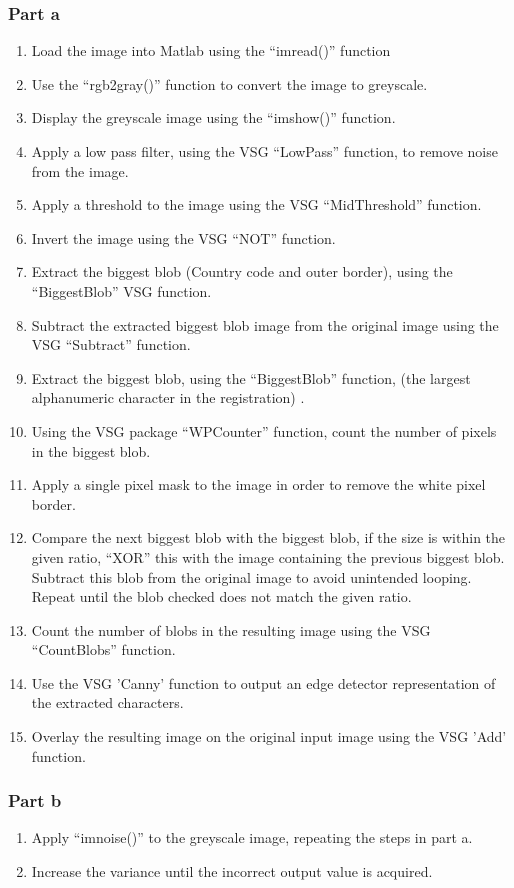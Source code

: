 \documentclass[a4paper]{article}
\begin{document}
	\subsubsection{Part a}
	\begin{enumerate}
		\item Load the image into Matlab using the ``imread()''
			function
		\item Use the ``rgb2gray()'' function to convert the image to
			greyscale.
		\item Display the greyscale image using the ``imshow()''
			function.
		\item Apply a low pass filter, using the VSG ``LowPass'' function,
			to remove noise from the image.
		\item Apply a threshold to the image using the VSG
			``MidThreshold'' function.
		\item Invert the image using the VSG ``NOT'' function.
		\item Extract the biggest blob (Country code and outer border),
			using the ``BiggestBlob'' VSG function.
		\item Subtract the extracted biggest blob image from the original
			image using the VSG ``Subtract'' function.
		\item Extract the biggest blob, using the ``BiggestBlob''
			function, (the largest alphanumeric character in the
			registration) .
		\item Using the VSG package ``WPCounter'' function, count the
			number of pixels in the biggest blob.
		\item Apply a single pixel mask to the image in order to remove
			the white pixel border.
		\item Compare the next biggest blob with the biggest blob, if
			the size is within the given ratio, ``XOR'' this with the
			image containing the previous biggest blob. Subtract
			this blob from the original image to avoid unintended
			looping. Repeat until the blob checked does not match
			the given ratio.
		\item Count the number of blobs in the resulting image using the
			VSG ``CountBlobs'' function.
		\item Use the VSG 'Canny' function to output an edge detector
			representation of the extracted characters.
		\item Overlay the resulting image on the original input image
			using the VSG 'Add' function.
	\end{enumerate}
	\subsubsection{Part b}
	\begin{enumerate}
		\item Apply ``imnoise()'' to the greyscale image, repeating the
			steps in part a.
		\item Increase the variance until the incorrect output value is
			acquired.
	\end{enumerate}
\end{document}
